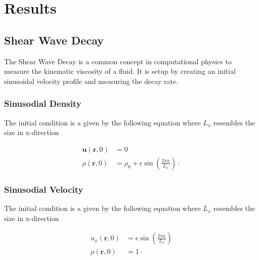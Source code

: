 \chapter{Results}


\section{Shear Wave Decay}
The Shear Wave Decay is a common concept in computational physics to measure the kinematic viscosity of a fluid.
It is setup by creating an initial sinusoidal velocity profile and measuring the decay rate.

\subsection{Sinusodial Density}
The initial condition is a given by the following equation where $L_x$ resembles the size in x-direction

\begin{equation*}
    \begin{aligned}
        \mathbf{u}(\mathbf{r},0) &= 0 \\
        \rho(\mathbf{r},0) &= \rho_0 + \epsilon \sin \left( \frac{2 \pi x}{L_x} \right) \cdot
    \end{aligned}
\end{equation*}

\subsection{Sinusodial Velocity}
The initial condition is a given by the following equation where $L_x$ resembles the size in x-direction

\begin{equation*}
    \begin{aligned}
        u_x(\mathbf{r},0) &= \epsilon \sin \left( \frac{2 \pi x}{L_x} \right) \\
        \rho(\mathbf{r},0) &= 1 \cdot
    \end{aligned}
\end{equation*}
